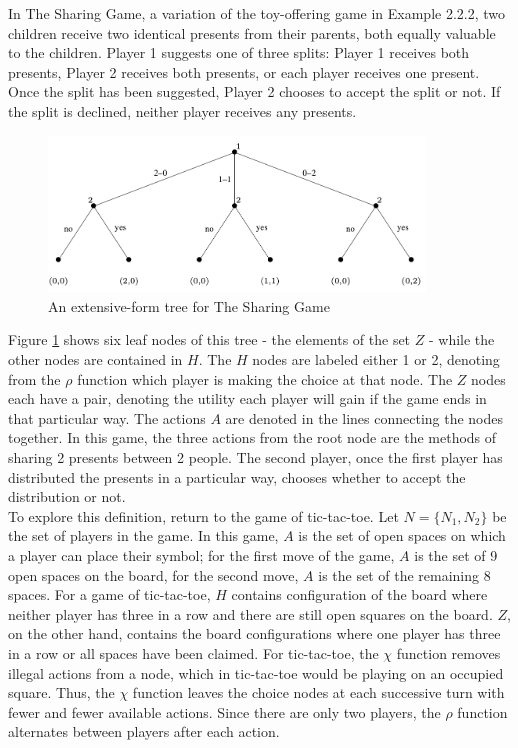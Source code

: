 \begin{exmp}
  In The Sharing Game, a variation of the toy-offering game in Example 2.2.2, two children receive two identical presents from their parents, both equally valuable to the children. Player 1 suggests one of three splits: Player 1 receives both presents, Player 2 receives both presents, or each player receives one present. Once the split has been suggested, Player 2 chooses to accept the split or not. If the split is declined, neither player receives any presents.

  \begin{figure}[H]
    \centering
    \includegraphics[width=10cm]{figures/ExampleTree.png}
    \caption{An extensive-form tree for The Sharing Game \cite{shoh09}}
    \label{fig:sharingTree}
  \end{figure}
\end{exmp}

Figure \ref{fig:sharingTree} shows six leaf nodes of this tree - the elements of the set $Z$ - while the other nodes are contained in $H$. The $H$ nodes are labeled either 1 or 2, denoting from the $\rho$ function which player is making the choice at that node. The $Z$ nodes each have a pair, denoting the utility each player will gain if the game ends in that particular way. The actions $A$ are denoted in the lines connecting the nodes together. In this game, the three actions from the root node are the methods of sharing 2 presents between 2 people. The second player, once the first player has distributed the presents in a particular way, chooses whether to accept the distribution or not.\\

To explore this definition, return to the game of tic-tac-toe. Let $N=\{N_1, N_2\}$ be the set of players in the game. In this game, $A$ is the set of open spaces on which a player can place their symbol; for the first move of the game, $A$ is the set of 9 open spaces on the board, for the second move, $A$ is the set of the remaining 8 spaces. For a game of tic-tac-toe, $H$ contains configuration of the board where neither player has three in a row and there are still open squares on the board. $Z$, on the other hand, contains the board configurations where one player has three in a row or all spaces have been claimed. For tic-tac-toe, the $\chi$ function removes illegal actions from a node, which in tic-tac-toe would be playing on an occupied square. Thus, the $\chi$ function leaves the choice nodes at each successive turn with fewer and fewer available actions. Since there are only two players, the $\rho$ function alternates between players after each action.

